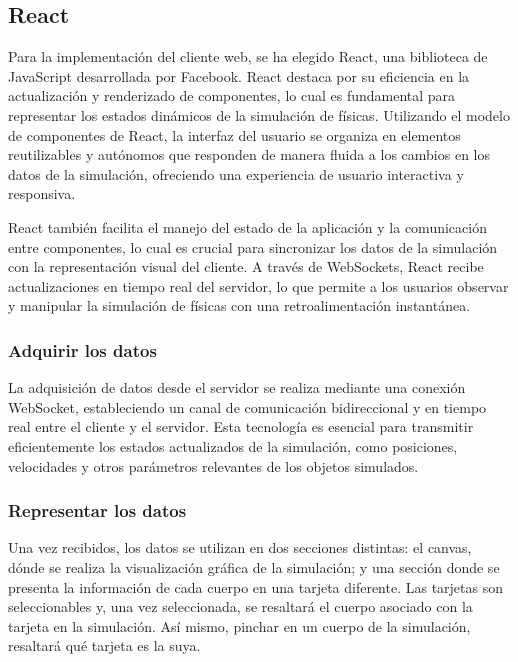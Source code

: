 \subsection{React}
Para la implementación del cliente web, se ha elegido React, una biblioteca de JavaScript desarrollada por Facebook. React destaca por su eficiencia en la actualización y renderizado de componentes, lo cual es fundamental para representar los estados dinámicos de la simulación de físicas. Utilizando el modelo de componentes de React, la interfaz del usuario se organiza en elementos reutilizables y autónomos que responden de manera fluida a los cambios en los datos de la simulación, ofreciendo una experiencia de usuario interactiva y responsiva.

React también facilita el manejo del estado de la aplicación y la comunicación entre componentes, lo cual es crucial para sincronizar los datos de la simulación con la representación visual del cliente. A través de WebSockets, React recibe actualizaciones en tiempo real del servidor, lo que permite a los usuarios observar y manipular la simulación de físicas con una retroalimentación instantánea.

\subsubsection{Adquirir los datos}
La adquisición de datos desde el servidor se realiza mediante una conexión WebSocket, estableciendo un canal de comunicación bidireccional y en tiempo real entre el cliente y el servidor. Esta tecnología es esencial para transmitir eficientemente los estados actualizados de la simulación, como posiciones, velocidades y otros parámetros relevantes de los objetos simulados.

\subsubsection{Representar los datos}
Una vez recibidos, los datos se utilizan en dos secciones distintas: el canvas, dónde se realiza la visualización gráfica de la simulación; y una sección donde se presenta la información de cada cuerpo en una tarjeta diferente. Las tarjetas son seleccionables y, una vez seleccionada, se resaltará el cuerpo asociado con la tarjeta en la simulación. Así mismo, pinchar en un cuerpo de la simulación, resaltará qué tarjeta es la suya. 
